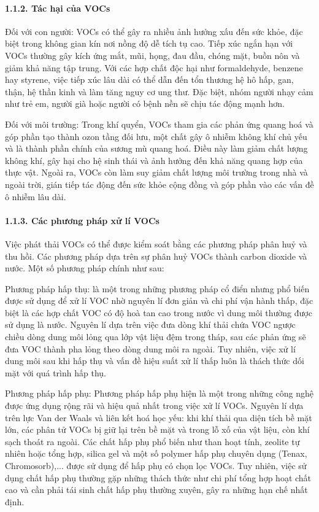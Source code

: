 \documentclass{article} %
\begin{document}
\paragraph*{1.1.2. Tác hại của VOCs}
\leavevmode

Đối với con người: VOCs có thể gây ra nhiều ảnh hưởng xấu đến sức khỏe, đặc biệt trong không gian kín nơi nồng độ dễ tích tụ cao. Tiếp xúc ngắn hạn với VOCs thường gây kích ứng mắt, mũi, họng, đau đầu, chóng mặt, buồn nôn và giảm khả năng tập trung. Với các hợp chất độc hại như formaldehyde, benzene hay styrene, việc tiếp xúc lâu dài có thể dẫn đến tổn thương hệ hô hấp, gan, thận, hệ thần kinh và làm tăng nguy cơ ung thư. Đặc biệt, nhóm người nhạy cảm như trẻ em, người già hoặc người có bệnh nền sẽ chịu tác động mạnh hơn.

Đối với môi trường: Trong khí quyển, VOCs tham gia các phản ứng quang hoá và góp phần tạo thành ozon tầng đối lưu, một chất gây ô nhiễm không khí chủ yếu và là thành phần chính của sương mù quang hoá. Điều này làm giảm chất lượng không khí, gây hại cho hệ sinh thái và ảnh hưởng đến khả năng quang hợp của thực vật. Ngoài ra, VOCs còn làm suy giảm chất lượng môi trường trong nhà và ngoài trời, gián tiếp tác động đến sức khỏe cộng đồng và góp phần vào các vấn đề ô nhiễm lâu dài.

\paragraph*{1.1.3. Các phương pháp xử lí VOCs}
\leavevmode

Việc phát thải VOCs có thể được kiểm soát bằng các phương pháp phân huỷ và thu hồi. Các phương pháp dựa trên sự phân huỷ VOCs thành carbon dioxide và nước. Một số phương pháp chính như sau:

Phương pháp hấp thụ: là một trong những phương pháp cổ điển nhưng phổ biến được sử dụng để xử lí VOC nhờ nguyên lí đơn giản và chi phí vận hành thấp, đặc biệt là các hợp chất VOC có độ hoà tan cao trong nước vì dung môi thường được sử dụng là nước. Nguyên lí dựa trên việc đưa dòng khí thải chứa VOC ngược chiều dòng dung môi lỏng qua lớp vật liệu đệm trong tháp, sau các phản ứng sẽ đưa VOC thành pha lỏng theo dòng dung môi ra ngoài. Tuy nhiên, việc xử lí dung môi sau khi hấp thụ và vấn đề hiệu suất xử lí thấp luôn là thách thức dối mặt với quá trình hấp thụ.

Phương pháp hấp phụ: Phương pháp hấp phụ hiện là một trong những công nghệ được ứng dụng rộng rãi và hiệu quả nhất trong việc xử lí VOCs. Nguyên lí dựa trên lực Van der Waals và liên kết hoá học yếu: khi khí thải qua diện tích bề mặt lớn, các phân tử VOCs bị giữ lại trên bề mặt và trong lỗ xố của vật liệu, còn khí sạch thoát ra ngoài. Các chất hấp phụ phổ biến như than hoạt tính, zeolite tự nhiên hoặc tổng hợp, silica gel và một số polymer hấp phụ chuyên dụng (Tenax, Chromosorb),... được sử dụng để hấp phụ có chọn lọc VOCs. Tuy nhiên, việc sử dụng chất hấp phụ thường gặp những thách thức như chi phí tổng hợp hoạt chất cao và cần phải tái sinh chất hấp phụ thường xuyên, gây ra những hạn chế nhất định.
\end{document}
